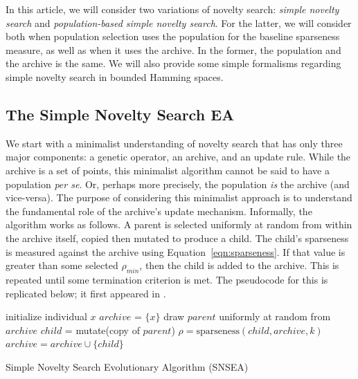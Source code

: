 \documentclass[twoside]{article}
\begin{document}
In this article, we will consider two variations of novelty search:  \emph{simple novelty search} and \emph{population-based simple novelty search}.  For the latter, we will consider both when population selection uses the population for the baseline sparseness measure, as well as when it uses the archive.   In the former, the population and the archive is the same.  We will also provide some simple formalisms regarding  simple novelty search in bounded Hamming spaces.

\subsection{The Simple Novelty Search EA}
\label{subsec:sns}

We start with a minimalist understanding of novelty search that has only three major components: a genetic operator, an archive, and an update rule.  While the archive is a set of points, this minimalist algorithm cannot be said to have a population \textit{per se}.  Or, perhaps more precisely, the population \emph{is} the archive (and vice-versa).  The purpose of considering this minimalist approach is to understand the fundamental role of the archive's update mechanism.  Informally, the algorithm works as follows.  A parent is selected uniformly at random from within the archive itself, copied then mutated to produce a child.  The child's sparseness is measured against the archive using Equation~\ref{eqn:sparseness}.  If that value is greater than some selected $\rho_{min}$, then the child is added to the archive.  This is repeated until some termination criterion is met.  The pseudocode for this is replicated below; it first appeared in \citet{Wiegand2020flairs}.

\begin{algorithm}[h]
  \SetAlgoLined
  \DontPrintSemicolon 
  
  \;
    
  initialize individual $x$\;
  $archive$ = $\{x\}$\;
   {
    draw $parent$ uniformly at random from $archive$\;
    $child$ = mutate(copy of $parent$)\;
    $\rho = \mbox{sparseness}(child, archive, k)$\;
     {
      $archive = archive \cup \{child\}$\;
     }
  }
  \caption{Simple Novelty Search Evolutionary Algorithm (SNSEA)}
\end{algorithm}
\end{document}
